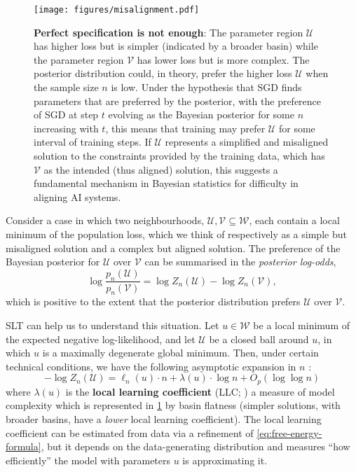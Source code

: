 \begin{figure}[t]
    \centering
    \texttt{[image: figures/misalignment.pdf]}
    \caption{\textbf{Perfect specification is not enough}: The parameter region $\mathcal{U}$ has higher loss but is simpler (indicated by a broader basin) while the parameter region $\mathcal{V}$ has lower loss but is more complex. The posterior distribution could, in theory, prefer the higher loss $\mathcal{U}$ when the sample size $n$ is low. Under the hypothesis that SGD finds parameters that are preferred by the posterior, with the preference of SGD at step $t$ evolving as the Bayesian posterior for some $n$ increasing with $t$, this means that training may prefer $\mathcal{U}$ for some interval of training steps. If $\mathcal{U}$ represents a simplified and misaligned solution to the constraints provided by the training data, which has $\mathcal{V}$ as the intended (thus aligned) solution, this suggests a fundamental mechanism in Bayesian statistics for difficulty in aligning AI systems.}
    \label{fig:w1_w2}
\end{figure}

Consider a case in which two neighbourhoods, $\mathcal{U}, \mathcal{V} \subseteq \mathcal{W}$, each contain a local minimum of the population loss, which we think of respectively as a simple but misaligned solution and a complex but aligned solution. The preference of the Bayesian posterior for $\mathcal{U}$ over $\mathcal{V}$ can be summarised in the \emph{posterior log-odds},
\begin{equation}\label{eq:posterior-odds}
    \log\frac{p_n(\mathcal{U})}{p_n(\mathcal{V})}
    =
    \log Z_n(\mathcal{U}) - \log Z_n(\mathcal{V}),
\end{equation}
which is positive to the extent that the posterior distribution prefers $\mathcal{U}$ over $\mathcal{V}$. 

SLT can help us to understand this situation. Let $u \in \mathcal{W}$ be a local minimum of the expected negative log-likelihood, and let $\mathcal{U}$ be a closed ball around $u$, in which $u$ is a maximally degenerate global minimum. 
%
Then, under certain technical conditions, we have the following asymptotic expansion in $n$
    \citetext{\citealp[Theorem 11]{watanabe2018}; \citealp{lau2024}}:
\begin{equation}\label{eq:free-energy-formula}
    -\log Z_n(\mathcal{U})
    = \ell_n(u) \cdot n
    + \lambda(u) \cdot \log n
    + O_p(\log\log n)
\end{equation}
where $\lambda(u)$ is the \textbf{local learning coefficient} (LLC; \citealt{lau2024}) a measure of model complexity which is represented in \cref{fig:w1_w2} by basin flatness (simpler solutions, with broader basins, have a \emph{lower} local learning coefficient). The local learning coefficient can be estimated from data via a refinement of \cref{eq:free-energy-formula}, but it depends on the data-generating distribution and measures ``how efficiently'' the model with parameters $u$ is approximating it.

